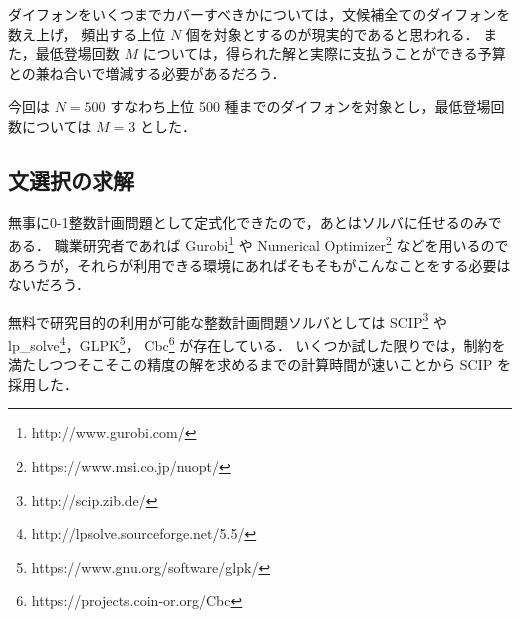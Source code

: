 \documentclass[final,10pt,twocolumn,3p,times,fleqn]{elsarticle}
\begin{document}
ダイフォンをいくつまでカバーすべきかについては，文候補全てのダイフォンを数え上げ，
頻出する上位 $N$ 個を対象とするのが現実的であると思われる．
また，最低登場回数 $M$ については，得られた解と実際に支払うことができる予算との兼ね合いで増減する必要があるだろう．

今回は $N = 500$ すなわち上位 500 種までのダイフォンを対象とし，最低登場回数については $M = 3$ とした．

  \subsection{文選択の求解}
  無事に0-1整数計画問題として定式化できたので，あとはソルバに任せるのみである．
  職業研究者であれば Gurobi\footnote{http://www.gurobi.com/} や Numerical Optimizer\footnote{https://www.msi.co.jp/nuopt/}
  などを用いるのであろうが，それらが利用できる環境にあればそもそもがこんなことをする必要はないだろう．

  無料で研究目的の利用が可能な整数計画問題ソルバとしては SCIP\footnote{http://scip.zib.de/} や
  lp\_solve\footnote{http://lpsolve.sourceforge.net/5.5/}，GLPK\footnote{https://www.gnu.org/software/glpk/}，
  Cbc\footnote{https://projects.coin-or.org/Cbc} が存在している．
  いくつか試した限りでは，制約を満たしつつそこそこの精度の解を求めるまでの計算時間が速いことから SCIP を採用した．
\end{document}
